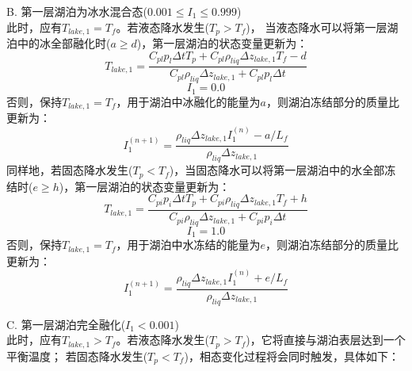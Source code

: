 B. 第一层湖泊为冰水混合态($0.001\le I_1\le0.999$)\\
此时，应有$T_{lake,1}=T_f$。若液态降水发生($T_p>T_f$)，
当液态降水可以将第一层湖泊中的冰全部融化时($a\geq d$)，第一层湖泊的状态变量更新为：
\begin{equation}
T_{lake, 1}=\frac{C_{pl} p_{l} \Delta t T_{p}+C_{pl} \rho_{liq} \Delta z_{lake, 1} T_{f}-d}{C_{pl} \rho_{liq} \Delta z_{lake, 1}+C_{pl} p_{l} \Delta t}
\end{equation}
\begin{equation}
I_{1}=0.0
\end{equation}
否则，保持$T_{lake,1}=T_f$，用于湖泊中冰融化的能量为$a$，则湖泊冻结部分的质量比更新为：
\begin{equation}
I_{1}^{(n+1)}=\frac{\rho_{liq} \Delta z_{lake, 1} I_{1}^{(n)}-a / L_{f}}{\rho_{liq} \Delta z_{lake, 1}}
\end{equation}
同样地，若固态降水发生($T_p<T_f$)，当固态降水可以将第一层湖泊中的水全部冻结时($e\geq h$)，第一层湖泊的状态变量更新为：
\begin{equation}
T_{lake, 1}=\frac{C_{p i} p_{i} \Delta t T_{p}+C_{p i} \rho_{liq} \Delta z_{lake, 1} T_{f}+h}{C_{p i} \rho_{liq} \Delta z_{lake, 1}+C_{p i} p_{i} \Delta t}
\end{equation}
\begin{equation}
I_{1}=1.0
\end{equation}
否则，保持$T_{lake,1}=T_f$，用于湖泊中水冻结的能量为$e$，则湖泊冻结部分的质量比更新为：
\begin{equation}
I_{1}^{(n+1)}=\frac{\rho_{liq} \Delta z_{lake, 1} I_{1}^{(n)}+e / L_{f}}{\rho_{liq} \Delta z_{lake, 1}}
\end{equation}

C. 	第一层湖泊完全融化($I_1<0.001$)\\
此时，应有$T_{lake,1}>T_f$。若液态降水发生($T_p>T_f$)，它将直接与湖泊表层达到一个平衡温度；
若固态降水发生($T_p<T_f$)，相态变化过程将会同时触发，具体如下：

